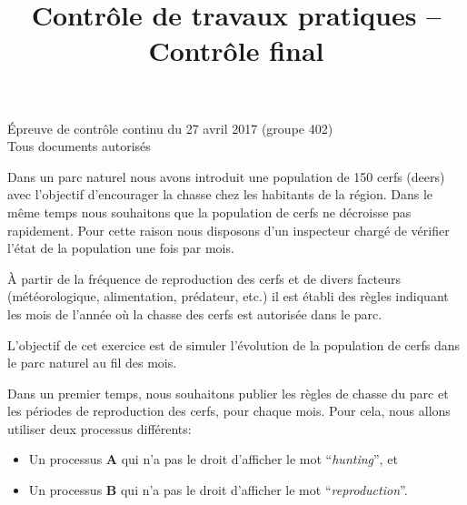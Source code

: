 \documentclass[CC,sansRappel,12pt]{tdtp-utf8}
\date{}
\title{Contrôle de travaux pratiques -- Contrôle final}
\begin{document}
\begin{feuille}

\hspace*{1mm} \hfill Épreuve de contrôle continu du 27 avril 2017 (groupe 402)\\
\hspace*{1mm} \hfill Tous documents autorisés\\[5mm]


\vspace{20pt}

Dans un parc naturel nous avons introduit une population de 150 cerfs (deers) avec l'objectif d'encourager la chasse chez les habitants de la région. Dans le même temps nous souhaitons que la population de cerfs ne décroisse pas rapidement. Pour cette raison nous disposons d'un inspecteur chargé de vérifier l'état de la population une fois par mois.

À partir de la fréquence de reproduction des cerfs et de divers facteurs (météorologique, alimentation, prédateur, etc.) il est établi des règles indiquant les mois de l'année où la chasse des cerfs est autorisée dans le parc.

L'objectif de cet exercice est de simuler l'évolution de la population de cerfs dans le parc naturel au fil des mois.

\begin{exercice}

Dans un premier temps, nous souhaitons publier les règles de chasse du parc et les périodes de reproduction des cerfs, pour chaque mois. Pour cela, nous allons utiliser deux processus différents:

\begin{itemize}
\item Un processus \textbf{A} qui n'a pas le droit d'afficher le mot ``\textit{hunting}'', et
\item Un processus \textbf{B} qui n'a pas le droit d'afficher le mot ``\textit{reproduction}''.
\end{itemize}


\end{exercice}
\end{feuille}
\end{document}
